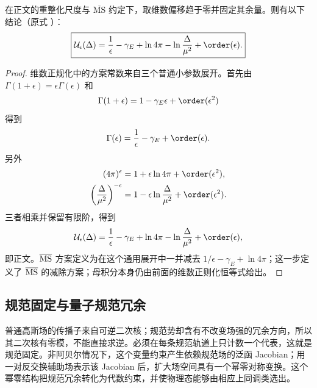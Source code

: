 \begin{proposition}
在正文的重整化尺度与 $\overline{\mathrm{MS}}$ 约定下，取维数偏移趋于零并固定其余量。则有以下结论（原式 ）：
\begin{equation*}
\boxed{
\mathcal U_\epsilon(\Delta)
=\frac1\epsilon-\gamma_E+\ln4\pi
-\ln\frac{\Delta}{\mu^2}+\order(\epsilon).}
\end{equation*}
\end{proposition}
\begin{proof}
维数正规化中的方案常数来自三个普通小参数展开。首先由 $\Gamma(1+\epsilon)=\epsilon\Gamma(\epsilon)$ 和
\begin{equation*}
 \Gamma(1+\epsilon)=1-\gamma_E\epsilon+\order(\epsilon^2)
\end{equation*}
得到
\begin{equation*}
 \Gamma(\epsilon)=\frac1\epsilon-\gamma_E+\order(\epsilon).
\end{equation*}
另外
\begin{align*}
 (4\pi)^\epsilon
 &=1+\epsilon\ln4\pi+\order(\epsilon^2),\\
 \left(\frac{\Delta}{\mu^2}\right)^{-\epsilon}
 &=1-\epsilon\ln\frac{\Delta}{\mu^2}+\order(\epsilon^2).
\end{align*}
三者相乘并保留有限阶，得到
\begin{equation*}
 \mathcal U_\epsilon(\Delta)
 =\frac1\epsilon-\gamma_E+\ln4\pi
 -\ln\frac{\Delta}{\mu^2}+\order(\epsilon),
\end{equation*}
即正文。$\overline{\rm MS}$ 方案定义为在这个通用展开中一并减去 $1/\epsilon-\gamma_E+\ln4\pi$；这一步定义了 $\overline{\rm MS}$ 的减除方案；母积分本身仍由前面的维数正则化恒等式给出。
\end{proof}








\subsection{规范固定与量子规范冗余}
普通高斯场的传播子来自可逆二次核；规范势却含有不改变场强的冗余方向，所以其二次核有零模，不能直接求逆。必须在每条规范轨道上只计数一个代表，这就是规范固定。非阿贝尔情况下，这个变量约束产生依赖规范场的泛函 Jacobian；用一对反交换辅助场表示该 Jacobian 后，扩大场空间具有一个幂零对称变换。这个幂零结构把规范冗余转化为代数约束，并使物理态能够由相应上同调类选出。


